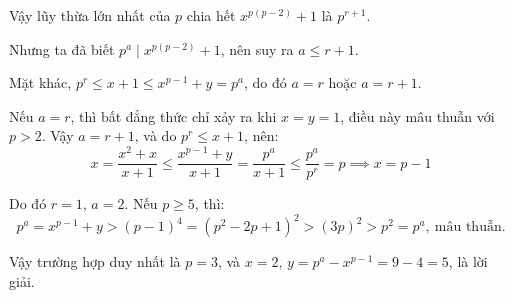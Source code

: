 \documentclass[../02-modular-arithmetic-b.tex]{subfiles}
\begin{document}
\begin{soln}
	Vậy lũy thừa lớn nhất của \( p \) chia hết \( x^{p(p-2)} + 1 \) là \( p^{r+1} \).

	Nhưng ta đã biết \( p^a \mid x^{p(p-2)} + 1 \), nên suy ra \( a \le r + 1 \).
	
	Mặt khác, \( p^r \le x + 1 \le x^{p-1} + y = p^a \), do đó \( a = r \) hoặc \( a = r + 1 \).
	
	Nếu \( a = r \), thì bất đẳng thức chỉ xảy ra khi \( x = y = 1 \), điều này mâu thuẫn với \( p > 2 \). Vậy \( a = r + 1 \), và do \( p^r \le x + 1 \), nên:
	\[
		x = \frac{x^2 + x}{x + 1} \le \frac{x^{p-1} + y}{x + 1} = \frac{p^a}{x + 1} \le \frac{p^a}{p^r} = p \implies x = p - 1
	\]
	
	Do đó \( r = 1 \), \( a = 2 \). Nếu \( p \ge 5 \), thì:
	\[
		p^a = x^{p - 1} + y > (p - 1)^4 = (p^2 - 2p + 1)^2 > (3p)^2 > p^2 = p^a,\ \text{mâu thuẫn.}
	\]
	
	Vậy trường hợp duy nhất là \( p = 3 \), và \( x = 2 \), \( y = p^a - x^{p - 1} = 9 - 4 = 5 \), là lời giải.
\end{soln}

\end{document}
